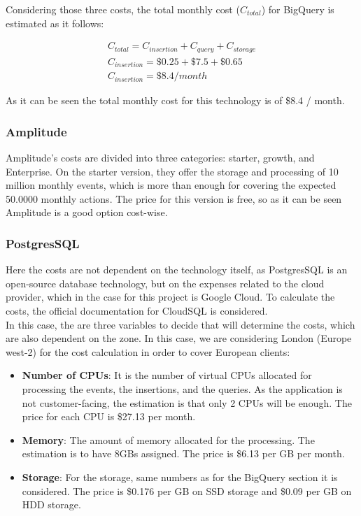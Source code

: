 \documentclass[english, 12pt, a4paper, sci, utf8, a-1b, online]{aaltothesis}
\begin{document}
Considering those three costs, the total monthly cost ($C_{total}$) for BigQuery is estimated as it follows:

\begin{equation}
\begin{split}
    C_{total} = C_{insertion} + C_{query} + C_{storage}\\
    C_{insertion} = \$0.25 + \$7.5 +\$0.65\\
    C_{insertion} = \$8.4 / month
\end{split}
\end{equation}

As it can be seen the total monthly cost for this technology is of \$8.4 / month.

\subsubsection*{Amplitude}

Amplitude's costs are divided into three categories: starter, growth, and Enterprise. On the starter version, they offer the storage and processing of 10 million monthly events, which is more than enough for covering the expected 50.0000 monthly actions. The price for this version is free, so as it can be seen Amplitude is a good option cost-wise.

\subsubsection*{PostgresSQL}

Here the costs are not dependent on the technology itself, as PostgresSQL is an open-source database technology, but on the expenses related to the cloud provider, which in the case for this project is Google Cloud. To calculate the costs, the official documentation for CloudSQL \cite{PostgreSQLonGCP} is considered.\\

In this case, the are three variables to decide that will determine the costs, which are also dependent on the zone. In this case, we are considering London (Europe west-2) for the cost calculation in order to cover European clients:

\begin{itemize}
    \item \textbf{Number of CPUs}: It is the number of virtual CPUs allocated for processing the events, the insertions, and the queries. As the application is not customer-facing, the estimation is that only 2 CPUs will be enough. The price for each CPU is \$27.13 per month.
    \item \textbf{Memory}: The amount of memory allocated for the processing. The estimation is to have 8GBs assigned. The price is \$6.13 per GB per month.
    \item \textbf{Storage}: For the storage, same numbers as for the BigQuery section it is considered. The price is \$0.176 per GB on SSD storage and \$0.09 per GB on HDD storage.
\end{itemize}
\end{document}

